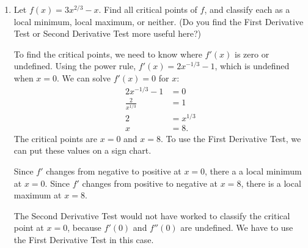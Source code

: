 \documentclass{article}
\begin{document}
\begin{enumerate}[resume]
\item 


  \begin{problem}[\vfill]    
    Let $f(x) = 3x^{2/3} - x$. Find all critical points of $f$, and classify each as a local minimum, local maximum, or neither. (Do you find the First Derivative Test or Second Derivative Test more useful here?)
  \end{problem}

  \begin{solution}
    To find the critical points, we need to know where $f'(x)$ is zero or undefined. Using
    the power rule, $f'(x) = 2x^{-1/3}-1$, which is undefined when $x=0$. We can solve
    $f'(x)=0$ for $x$:
    \begin{align*}
      2x^{-1/3} -1 &= 0 \\
      \frac{2}{x^{1/3}} &= 1 \\
      2 &= x^{1/3} \\
      x &= 8.
    \end{align*}
    The critical points are $x=0$ and $x=8$. 
    To use the First Derivative Test, we can put these values on a sign chart.
    \begin{center}
      \end{center}
     Since $f'$ changes from negative to positive at $x=0$, there a a local minimum at $x=0$.
     Since $f'$ changes from positive to negative at $x=8$, there is a local maximum at $x=8$.

     The Second Derivative Test would not have worked to classify the critical point
     at $x=0$, because $f'(0)$ and $f''(0)$ are undefined. 
     We have to use the First Derivative Test
     in this case.
  \end{solution}


\end{enumerate}
\end{document}
